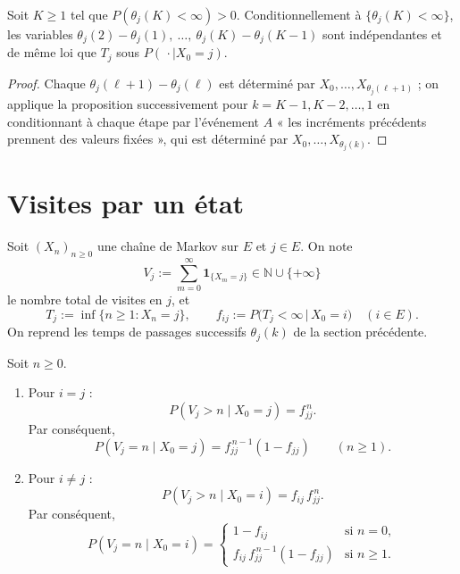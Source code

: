\begin{corollaire}[Intervalles i.i.d.]
Soit $K\ge 1$ tel que $P(\theta_j(K)<\infty)>0$. Conditionnellement à $\{\theta_j(K)<\infty\}$, les variables
$\theta_j(2)-\theta_j(1),\ \dots,\ \theta_j(K)-\theta_j(K-1)$
sont indépendantes et de même loi que $T_j$ sous $P(\,\cdot\mid X_0=j)$.
\end{corollaire}

\begin{proof}
Chaque $\theta_j(\ell+1)-\theta_j(\ell)$ est déterminé par $X_0,\dots,X_{\theta_j(\ell+1)}$ ; on applique la proposition successivement pour $k=K-1,K-2,\dots,1$ en conditionnant à chaque étape par l'événement $A$ « les incréments précédents prennent des valeurs fixées », qui est déterminé par $X_0,\dots,X_{\theta_j(k)}$.
\end{proof}

\section{Visites par un état}

Soit $(X_n)_{n\ge0}$ une chaîne de Markov sur $E$ et $j\in E$. On note
\[
V_j:=\sum_{m=0}^{\infty}\mathbf 1_{\{X_m=j\}}\in\mathbb N\cup\{+\infty\}
\]
le nombre total de visites en $j$, et
\[
T_j:=\inf\{n\ge1 : X_n=j\},\qquad
f_{ij}:=P\big(T_j<\infty\,\big|\,X_0=i\big)\quad(i\in E).
\]
On reprend les temps de passages successifs $\theta_j(k)$ de la section précédente.

\begin{theoreme}\label{thm:visites}
Soit $n\ge 0$.
\begin{enumerate}
\item Pour $i=j$ :
\[
P(V_j>n\mid X_0=j)=f_{jj}^{\,n}.
\]
Par conséquent,
\[
P(V_j=n\mid X_0=j)=f_{jj}^{\,n-1}(1-f_{jj})\qquad(n\ge1).
\]
\item Pour $i\neq j$ :
\[
P(V_j>n\mid X_0=i)=f_{ij}\,f_{jj}^{\,n}.
\]
Par conséquent,
\[
P(V_j=n\mid X_0=i)=
\begin{cases}
1-f_{ij} & \text{si } n=0,\\[2pt]
f_{ij}\,f_{jj}^{\,n-1}(1-f_{jj}) & \text{si } n\ge1.
\end{cases}
\]
\end{enumerate}
\end{theoreme}

